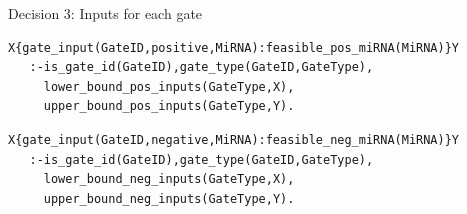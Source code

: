 \documentclass[10pt,dvipsnames]{beamer}
\begin{document}
\begin{frame}[fragile]{Decision 3: Inputs for each gate}
\small
{\color{blue}{\large positive inputs:}}
\begin{verbatim}
X{gate_input(GateID,positive,MiRNA):feasible_pos_miRNA(MiRNA)}Y 
   :-is_gate_id(GateID),gate_type(GateID,GateType),
     lower_bound_pos_inputs(GateType,X), 
     upper_bound_pos_inputs(GateType,Y).
\end{verbatim}

{\color{blue}{\large negative inputs:}}
\begin{verbatim}
X{gate_input(GateID,negative,MiRNA):feasible_neg_miRNA(MiRNA)}Y 
   :-is_gate_id(GateID),gate_type(GateID,GateType),
     lower_bound_neg_inputs(GateType,X),
     upper_bound_neg_inputs(GateType,Y).
\end{verbatim}
\end{frame}
\end{document}
